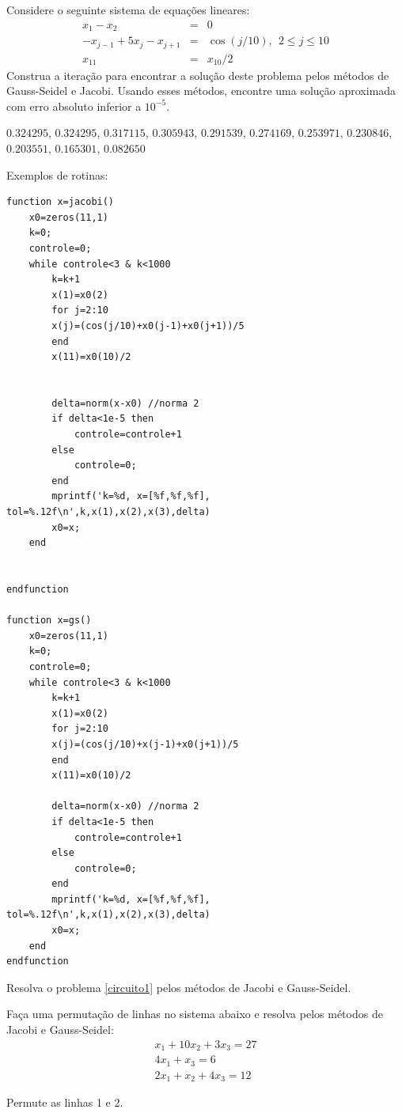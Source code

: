 \begin{Exercise} Considere o seguinte sistema de equações lineares:
\begin{eqnarray}
x_1-x_2&=&0\nonumber\\
-x_{j-1}+5x_j-x_{j+1}&=&\cos(j/10),~~ 2\leq j \leq 10\nonumber\\
x_{11}&=&x_{10}/2
\end{eqnarray}
Construa a iteração para encontrar a solução deste problema pelos métodos de Gauss-Seidel e Jacobi. Usando esses métodos, encontre uma solução aproximada com erro absoluto inferior a $10^{-5}$.
\end{Exercise}
\begin{Answer}
$0.324295$, $0.324295$, $0.317115$, $0.305943$, $0.291539$, $0.274169$, $0.253971$, $0.230846$, $0.203551$, $0.165301$, $0.082650$

\ifisscilab
Exemplos de rotinas:
\begin{verbatim}
function x=jacobi()
    x0=zeros(11,1)
    k=0;
    controle=0;
    while controle<3 & k<1000
        k=k+1
        x(1)=x0(2)
        for j=2:10
        x(j)=(cos(j/10)+x0(j-1)+x0(j+1))/5
        end
        x(11)=x0(10)/2


        delta=norm(x-x0) //norma 2
        if delta<1e-5 then
            controle=controle+1
        else
            controle=0;
        end
        mprintf('k=%d, x=[%f,%f,%f], tol=%.12f\n',k,x(1),x(2),x(3),delta)
        x0=x;
    end


endfunction

function x=gs()
    x0=zeros(11,1)
    k=0;
    controle=0;
    while controle<3 & k<1000
        k=k+1
        x(1)=x0(2)
        for j=2:10
        x(j)=(cos(j/10)+x(j-1)+x0(j+1))/5
        end
        x(11)=x0(10)/2

        delta=norm(x-x0) //norma 2
        if delta<1e-5 then
            controle=controle+1
        else
            controle=0;
        end
        mprintf('k=%d, x=[%f,%f,%f], tol=%.12f\n',k,x(1),x(2),x(3),delta)
        x0=x;
    end
endfunction
\end{verbatim}
\end{Answer}
\fi

\begin{Exercise} Resolva o problema \ref{circuito1} pelos métodos de Jacobi e Gauss-Seidel.
\end{Exercise}

\begin{Exercise} Faça uma permutação de linhas no sistema abaixo e resolva pelos métodos de Jacobi e Gauss-Seidel:
\begin{eqnarray*}
x_1+10x_2+3x_3=27\\
4x_1+x_3=6\\
2x_1+x_2+4x_3=12
\end{eqnarray*}
\end{Exercise}
\begin{Answer}Permute as linhas 1 e 2.
\end{Answer}



